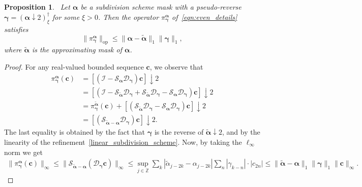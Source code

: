 \documentclass[12pt]{article}
\newtheorem{prop}[theorem]{Proposition}
\begin{document}
\begin{prop}~\label{prop:even_details_error}
Let $\boldsymbol{\alpha}$ be a subdivision scheme mask with a pseudo-reverse $\boldsymbol{\gamma}=(\boldsymbol{\alpha}\downarrow 2)^\dagger_\xi$ for some $\xi>0$. Then the operator $\pi^{\boldsymbol{\alpha}}_{\boldsymbol{\gamma}}$ of~\eqref{eqn:even_details} satisfies
\begin{equation}
    \|\pi^{\boldsymbol{\alpha}}_{\boldsymbol{\gamma}}\|_{\text{op}}
    \leq \|\boldsymbol{\alpha}-\widetilde{\boldsymbol{\alpha}}\|_1\|\boldsymbol{\gamma}\|_1,
\end{equation}
where $\widetilde{\boldsymbol{\alpha}}$ is the approximating mask of $\boldsymbol{\alpha}$.
\end{prop}

\begin{proof}
    For any real-valued bounded sequence $\boldsymbol{c}$, we observe that
    \begin{align*}
        \pi^{\boldsymbol{\alpha}}_{\boldsymbol{\gamma}}(\boldsymbol{c}) & = [(\mathcal{I}-\mathcal{S}_{\boldsymbol{\alpha}} \mathcal{D}_{\boldsymbol{\gamma}})\boldsymbol{c}]\downarrow 2
        \\ & = [(\mathcal{I}-\mathcal{S}_{\widetilde{\boldsymbol{\alpha}}} \mathcal{D}_{\boldsymbol{\gamma}}+\mathcal{S}_{\widetilde{\boldsymbol{\alpha}}} \mathcal{D}_{\boldsymbol{\gamma}}-\mathcal{S}_{\boldsymbol{\alpha}} \mathcal{D}_{\boldsymbol{\gamma}})\boldsymbol{c}]\downarrow 2
        \\ & = \pi^{\widetilde{\boldsymbol{\alpha}}}_{\boldsymbol{\gamma}}(\boldsymbol{c}) + [(\mathcal{S}_{\widetilde{\boldsymbol{\alpha}}} \mathcal{D}_{\boldsymbol{\gamma}}-\mathcal{S}_{\boldsymbol{\alpha}} \mathcal{D}_{\boldsymbol{\gamma}})\boldsymbol{c}]\downarrow 2
        \\ & = [(\mathcal{S}_{\widetilde{\boldsymbol{\alpha}}-\boldsymbol{\alpha}} \mathcal{D}_{\boldsymbol{\gamma}})\boldsymbol{c}]\downarrow 2.
    \end{align*}
    The last equality is obtained by the fact that $\boldsymbol{\gamma}$ is the reverse of $\widetilde{\boldsymbol{\alpha}}\downarrow 2$, and by the linearity of the refinement~\eqref{linear_subdivision_scheme}. Now, by taking the $\ell_\infty$ norm we get
    \begin{align*}
        \|\pi^{\boldsymbol{\alpha}}_{\boldsymbol{\gamma}}(\boldsymbol{c})\|_\infty \leq \|\mathcal{S}_{\widetilde{\boldsymbol{\alpha}}-\boldsymbol{\alpha}} (\mathcal{D}_{\boldsymbol{\gamma}}\boldsymbol{c})\|_\infty 
        \leq \sup_{j\in\mathbb{Z}} \sum_{k}|\widetilde{\alpha}_{j-2k}-\alpha_{j-2k}|\sum_{n}|\gamma_{k-n}|\cdot |c_{2n}|\leq \|\widetilde{\boldsymbol{\alpha}}-\boldsymbol{\alpha}\|_1 \|\boldsymbol{\gamma}\|_1 \|\boldsymbol{c}\|_\infty.

\end{align*}
\end{proof}
\end{document}

